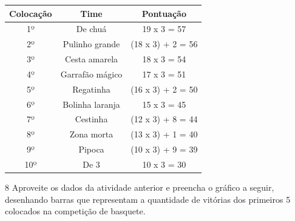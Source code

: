 \begin{table}[H]
\centering
\begin{tabular}{|c|c|c|}
\hline
\textbf{Colocação} & \textbf{Time}                          & \textbf{Pontuação}                       \\ \hline
1º                 & {\color[HTML]{EB3597} De chuá}         & {\color[HTML]{EB3597} 19 x 3 = 57}       \\ \hline
2º                 & {\color[HTML]{EB3597} Pulinho grande}  & {\color[HTML]{EB3597} (18 x 3) + 2 = 56} \\ \hline
3º                 & {\color[HTML]{EB3597} Cesta amarela}   & {\color[HTML]{EB3597} 18 x 3 = 54}       \\ \hline
4º                 & {\color[HTML]{EB3597} Garrafão mágico} & {\color[HTML]{EB3597} 17 x 3 = 51}       \\ \hline
5º                 & {\color[HTML]{EB3597} Regatinha}       & {\color[HTML]{EB3597} (16 x 3) + 2 = 50} \\ \hline
6º                 & {\color[HTML]{EB3597} Bolinha laranja} & {\color[HTML]{EB3597} 15 x 3 = 45}       \\ \hline
7º                 & {\color[HTML]{EB3597} Cestinha}        & {\color[HTML]{EB3597} (12 x 3) + 8 = 44} \\ \hline
8º                 & {\color[HTML]{EB3597} Zona morta}      & {\color[HTML]{EB3597} (13 x 3) + 1 = 40} \\ \hline
9º                 & {\color[HTML]{EB3597} Pipoca}          & {\color[HTML]{EB3597} (10 x 3) + 9 = 39} \\ \hline
10º                & {\color[HTML]{EB3597} De 3}            & {\color[HTML]{EB3597} 10 x 3 = 30}       \\ \hline
\end{tabular}
\end{table}

\pagebreak
\num{8} Aproveite os dados da atividade anterior e preencha o gráfico a seguir,
desenhando barras que representam a quantidade de vitórias dos primeiros
5 colocados na competição de basquete.

